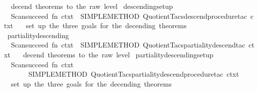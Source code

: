 \begin{isabellebody}
\ \ {\isacartoucheopen}decend\ theorems\ to\ the\ raw\ level{\isacartoucheclose}\isanewline
\isanewline
{}\isamarkupfalse%
\ descending{\isacharunderscore}{\kern0pt}setup\ {\isacharequal}{\kern0pt}\isanewline
\ \ {\isacartoucheopen}Scan{\isachardot}{\kern0pt}succeed\ {\isacharparenleft}{\kern0pt}fn\ ctxt\ {\isacharequal}{\kern0pt}{\isachargreater}{\kern0pt}\ SIMPLE{\isacharunderscore}{\kern0pt}METHOD{\isacharprime}{\kern0pt}\ {\isacharparenleft}{\kern0pt}Quotient{\isacharunderscore}{\kern0pt}Tacs{\isachardot}{\kern0pt}descend{\isacharunderscore}{\kern0pt}procedure{\isacharunderscore}{\kern0pt}tac\ ctxt\ {\isacharbrackleft}{\kern0pt}{\isacharbrackright}{\kern0pt}{\isacharparenright}{\kern0pt}{\isacharparenright}{\kern0pt}{\isacartoucheclose}\isanewline
\ \ {\isacartoucheopen}set\ up\ the\ three\ goals\ for\ the\ decending\ theorems{\isacartoucheclose}\isanewline
\isanewline
{}\isamarkupfalse%
\ partiality{\isacharunderscore}{\kern0pt}descending\ {\isacharequal}{\kern0pt}\isanewline
\ \ {\isacartoucheopen}Scan{\isachardot}{\kern0pt}succeed\ {\isacharparenleft}{\kern0pt}fn\ ctxt\ {\isacharequal}{\kern0pt}{\isachargreater}{\kern0pt}\ SIMPLE{\isacharunderscore}{\kern0pt}METHOD{\isacharprime}{\kern0pt}\ {\isacharparenleft}{\kern0pt}Quotient{\isacharunderscore}{\kern0pt}Tacs{\isachardot}{\kern0pt}partiality{\isacharunderscore}{\kern0pt}descend{\isacharunderscore}{\kern0pt}tac\ ctxt\ {\isacharbrackleft}{\kern0pt}{\isacharbrackright}{\kern0pt}{\isacharparenright}{\kern0pt}{\isacharparenright}{\kern0pt}{\isacartoucheclose}\isanewline
\ \ {\isacartoucheopen}decend\ theorems\ to\ the\ raw\ level{\isacartoucheclose}\isanewline
\isanewline
{}\isamarkupfalse%
\ partiality{\isacharunderscore}{\kern0pt}descending{\isacharunderscore}{\kern0pt}setup\ {\isacharequal}{\kern0pt}\isanewline
\ \ {\isacartoucheopen}Scan{\isachardot}{\kern0pt}succeed\ {\isacharparenleft}{\kern0pt}fn\ ctxt\ {\isacharequal}{\kern0pt}{\isachargreater}{\kern0pt}\isanewline
\ \ \ \ \ \ \ SIMPLE{\isacharunderscore}{\kern0pt}METHOD{\isacharprime}{\kern0pt}\ {\isacharparenleft}{\kern0pt}Quotient{\isacharunderscore}{\kern0pt}Tacs{\isachardot}{\kern0pt}partiality{\isacharunderscore}{\kern0pt}descend{\isacharunderscore}{\kern0pt}procedure{\isacharunderscore}{\kern0pt}tac\ ctxt\ {\isacharbrackleft}{\kern0pt}{\isacharbrackright}{\kern0pt}{\isacharparenright}{\kern0pt}{\isacharparenright}{\kern0pt}{\isacartoucheclose}\isanewline
\ \ {\isacartoucheopen}set\ up\ the\ three\ goals\ for\ the\ decending\ theorems{\isacartoucheclose}\isanewline

\end{isabellebody}
